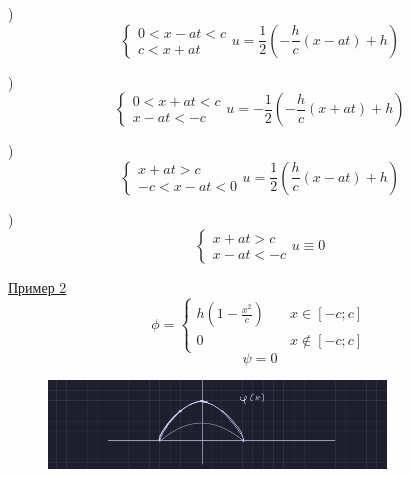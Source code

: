 \documentclass[a4paper]{article}
\begin{document}
)
\[
    \begin{cases}
        0 < x - at < c\\
        c < x + at
    \end{cases}
    u = \frac{1}{2} \left( -\frac{h}{c} (x - at) + h \right)
\]

)
\[
    \begin{cases}
        0 < x + at < c\\
        x - at < -c
    \end{cases}
    u = -\frac{1}{2} \left( -\frac{h}{c} (x + at) + h \right)
\]

)
\[
    \begin{cases}
        x + at > c\\
        -c < x - at < 0
    \end{cases}
    u = \frac{1}{2} \left( \frac{h}{c} (x -at) + h \right)
\]

)
\[
    \begin{cases}
        x + at > c\\
        x - at < -c
    \end{cases}
    u \equiv 0
\]

\begin{tcolorbox}
    \underline{Пример 2}
    \[
        \phi = \begin{cases}
            h \left( 1 - \frac{x^2}{c} \right) &\quad x \in [-c; c]\\
            0 &\quad x \notin [-c; c]
        \end{cases}
    \]
    \[
        \psi = 0
    \]
\end{tcolorbox}

\begin{figure}[!ht]
    \centering
    \includegraphics[width=0.8\textwidth]{mp-sem-pic3.png}
\end{figure}
\end{document}
